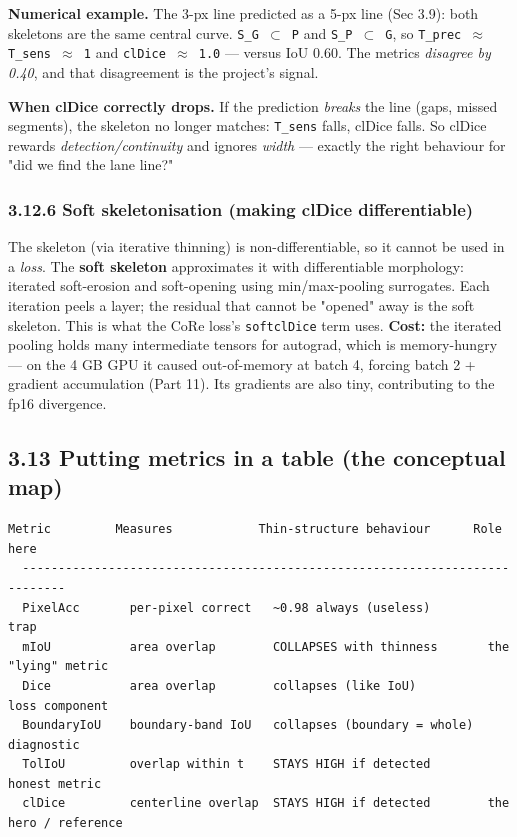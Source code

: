 \documentclass[11pt]{article}
\begin{document}
\textbf{Numerical example.} The 3-px line predicted as a 5-px line (Sec 3.9): both skeletons are the same central curve. \texttt{S\_G $\subset$ P} and \texttt{S\_P $\subset$ G}, so \texttt{T\_prec $\approx$ T\_sens $\approx$ 1} and \texttt{clDice $\approx$ 1.0} --- versus IoU 0.60. The metrics \textit{disagree by 0.40}, and that disagreement is the project's signal.

\textbf{When clDice correctly drops.} If the prediction \textit{breaks} the line (gaps, missed segments), the skeleton no longer matches: \texttt{T\_sens} falls, clDice falls. So clDice rewards \textit{detection/continuity} and ignores \textit{width} --- exactly the right behaviour for "did we find the lane line?"

\subsubsection*{3.12.6 Soft skeletonisation (making clDice differentiable)}
The skeleton (via iterative thinning) is non-differentiable, so it cannot be used in a \textit{loss}. The \textbf{soft skeleton} approximates it with differentiable morphology: iterated soft-erosion and soft-opening using min/max-pooling surrogates. Each iteration peels a layer; the residual that cannot be "opened" away is the soft skeleton. This is what the CoRe loss's \texttt{softclDice} term uses. \textbf{Cost:} the iterated pooling holds many intermediate tensors for autograd, which is memory-hungry --- on the 4 GB GPU it caused out-of-memory at batch 4, forcing batch 2 + gradient accumulation (Part 11). Its gradients are also tiny, contributing to the fp16 divergence.

\subsection*{3.13 Putting metrics in a table (the conceptual map)}

\begin{Verbatim}[breaklines=true,breakanywhere=true,fontsize=\footnotesize]
  Metric         Measures            Thin-structure behaviour      Role here
  ----------------------------------------------------------------------------
  PixelAcc       per-pixel correct   ~0.98 always (useless)        trap
  mIoU           area overlap        COLLAPSES with thinness       the "lying" metric
  Dice           area overlap        collapses (like IoU)          loss component
  BoundaryIoU    boundary-band IoU   collapses (boundary = whole)  diagnostic
  TolIoU         overlap within t    STAYS HIGH if detected        honest metric
  clDice         centerline overlap  STAYS HIGH if detected        the hero / reference
\end{Verbatim}
\end{document}
